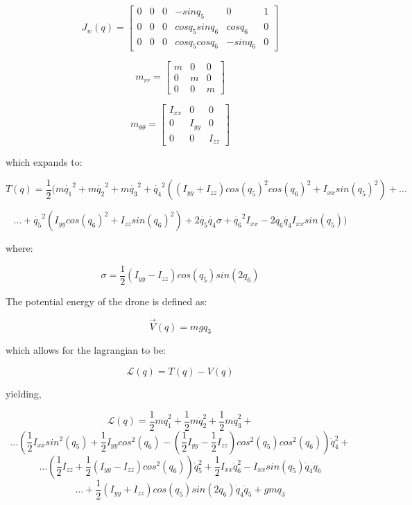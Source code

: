 \documentclass[10pt, letterpaper]{article}
\begin{document}
\[
J_{w}(q)=\left[\begin{array}{cccccc}
0 & 0 & 0 & -sinq_{5} & 0 & 1\\
0 & 0 & 0 & cosq_{5}sinq_{6} & cosq_{6} & 0\\
0 & 0 & 0 & cosq_{5}cosq_{6} & -sinq_{6} & 0
\end{array}\right]
\]

\[
m_{rr}=\left[\begin{array}{ccc}
m & 0 & 0\\
0 & m & 0\\
0 & 0 & m
\end{array}\right]
\]

\[
m_{\theta\theta}=\left[\begin{array}{ccc}
I_{xx} & 0 & 0\\
0 & I_{yy} & 0\\
0 & 0 & I_{zz}
\end{array}\right]
\]

which expands to:

\[
T(q)=\frac{1}{2}(m\dot{q_{1}}^{2}+m\dot{q_{2}}^{2}+m\dot{q_{3}}^{2}+\dot{q_{4}}^{2}((I_{yy}+I_{zz})cos(q_{5})^{2}cos(q_{6})^{2}+I_{xx}sin(q_{5})^{2})+\ldots
\]

\[
\ldots+\dot{q_{5}}^{2}(I_{yy}cos(q_{6})^{2}+I_{zz}sin(q_{6})^{2})+2\dot{q_{5}}\dot{q_{4}}\sigma+\dot{q_{6}}^{2}I_{xx}-2\dot{q_{6}}\dot{q_{4}}I_{xx}sin(q_{5}))
\]

where:

\[
\sigma=\frac{1}{2}(I_{yy}-I_{zz}){cos}(q_{5}){sin}(2q_{6})
\]

The potential energy of the drone is defined as:

\[
\overrightarrow{V}(q)=mgq_{3}
\]

which allows for the lagrangian to be:

\[
\mathcal{L}(q)=T(q)-V(q)
\]

yielding,

\[
\mathcal{L}(q) = \frac{1}{2} m \dot{q}_{1}^{2} + \frac{1}{2} m \dot{q}_{2}^{2} + \frac{1}{2} m \dot{q}_{3}^{2} + 
\]
\[
\ldots(\frac{1}{2} I_{xx} {sin}^{2}(q_{5}) + \frac{1}{2} I_{yy} {cos}^{2}(q_{6}) - (\frac{1}{2} I_{yy} - \frac{1}{2} I_{zz}) {cos}^{2}(q_{5}) {cos}^{2}(q_{6})) \dot{q}_{4}^{2} + 
\]
\[
\dots(\frac{1}{2} I_{zz} + \frac{1}{2} (I_{yy} - I_{zz}) {cos}^{2}(q_{6})) \dot{q}_{5}^{2} + \frac{1}{2} I_{xx} \dot{q}_{6}^{2} - I_{xx} {sin}(q_{5}) \dot{q}_{4} \dot{q}_{6} 
\]
\[
\ldots+ \frac{1}{2}(I_{yy} + I_{zz}) {cos}(q_{5}){sin}(2q_{6}) \dot{q}_{4} \dot{q}_{5}+ g m q_{3}
\]
\end{document}
